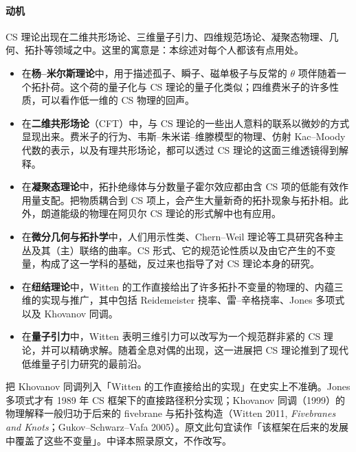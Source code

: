 \paragraph{动机}
CS 理论出现在二维共形场论、三维量子引力、四维规范场论、凝聚态物理、几何、拓扑等领域之中。这里的寓意是：本综述对每个人都该有点用处。

\begin{itemize}[leftmargin=1.4em,itemsep=4pt,topsep=2pt]
  \item 在\textbf{杨--米尔斯理论}中，用于描述孤子、瞬子、磁单极子与反常的 $\theta$ 项伴随着一个拓扑荷。这个荷的量子化与 CS 理论的量子化类似；四维费米子的许多性质，可以看作低一维的 CS 物理的回声。
  \item 在\textbf{二维共形场论}（CFT）中，与 CS 理论的一些出人意料的联系以微妙的方式显现出来。费米子的行为、韦斯--朱米诺--维滕模型的物理、仿射 Kac--Moody 代数的表示，以及有理共形场论，都可以透过 CS 理论的这面三维透镜得到解释。
  \item 在\textbf{凝聚态理论}中，拓扑绝缘体与分数量子霍尔效应都由含 CS 项的低能有效作用量支配。把物质耦合到 CS 项上，会产生大量新奇的拓扑现象与拓扑相。此外，朗道能级的物理在阿贝尔 CS 理论的形式解中也有应用。
  \item 在\textbf{微分几何与拓扑学}中，人们用示性类、Chern--Weil 理论等工具研究各种主丛及其（主）联络的曲率。CS 形式、它的规范论性质以及由它产生的不变量，构成了这一学科的基础，反过来也指导了对 CS 理论本身的研究。
  \item 在\textbf{纽结理论}中，Witten 的工作直接给出了许多拓扑不变量的物理的、内蕴三维的实现与推广，其中包括 Reidemeister 挠率、雷--辛格挠率、Jones 多项式以及 Khovanov 同调。
  \item 在\textbf{量子引力}中，Witten 表明三维引力可以改写为一个规范群非紧的 CS 理论，并可以精确求解。随着全息对偶的出现，这一进展把 CS 理论推到了现代低维量子引力研究的最前沿。
\end{itemize}

\begin{yizhu}[原文疑误]
把 Khovanov 同调列入「Witten 的工作直接给出的实现」在史实上不准确。Jones 多项式才有 1989 年 CS 框架下的直接路径积分实现；Khovanov 同调（1999）的物理解释一般归功于后来的 fivebrane 与拓扑弦构造（Witten 2011, \emph{Fivebranes and Knots}；Gukov--Schwarz--Vafa 2005）。原文此句宜读作「该框架在后来的发展中覆盖了这些不变量」。中译本照录原文，不作改写。
\end{yizhu}

